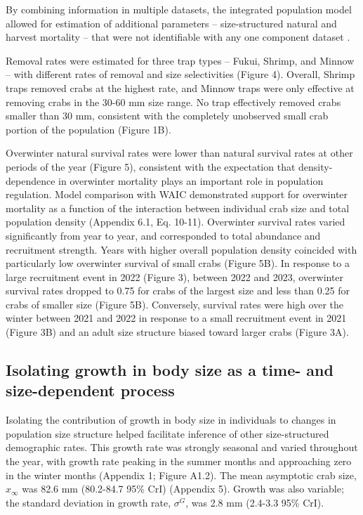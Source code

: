 \documentclass{article}
\begin{document}
By combining information in multiple datasets, the integrated population model allowed for estimation of additional parameters -- size-structured natural and harvest mortality -- that were not identifiable with any one component dataset \parencite{riecke2019integrated}.

Removal rates were estimated for three trap types -- Fukui, Shrimp, and Minnow -- with different rates of removal and size selectivities (Figure 4). Overall, Shrimp traps removed crabs at the highest rate, and Minnow traps were only effective at removing crabs in the 30-60 mm size range. No trap effectively removed crabs smaller than 30 mm, consistent with the completely unobserved small crab portion of the population (Figure 1B).

Overwinter natural survival rates were lower than natural survival rates at other periods of the year (Figure 5), consistent with the expectation that density-dependence in overwinter mortality plays an important role in population regulation. Model comparison with WAIC demonstrated support for overwinter mortality as a function of the interaction between individual crab size and total population density (Appendix 6.1, Eq. 10-11). Overwinter survival rates varied significantly from year to year, and corresponded to total abundance and recruitment strength. Years with higher overall population density coincided with particularly low overwinter survival of small crabs (Figure 5B). In response to a large recruitment event in 2022 (Figure 3), between 2022 and 2023, overwinter survival rates dropped to 0.75 for crabs of the largest size and less than 0.25 for crabs of smaller size (Figure 5B). Conversely, survival rates were high over the winter between 2021 and 2022 in response to a small recruitment event in 2021 (Figure 3B) and an adult size structure biased toward larger crabs (Figure 3A). 

\subsection{Isolating growth in body size as a time- and size-dependent process}

Isolating the contribution of growth in body size in individuals to changes in population size structure helped facilitate inference of other size-structured demographic rates. This growth rate was strongly seasonal and varied throughout the year, with growth rate peaking in the summer months and approaching zero in the winter months (Appendix 1; Figure A1.2). The mean asymptotic crab size, $x_{\infty}$ was 82.6 mm (80.2-84.7 95\% CrI) (Appendix 5). Growth was also variable; the standard deviation in growth rate, $\sigma^G$, was 2.8 mm (2.4-3.3 95\% CrI).
\end{document}
